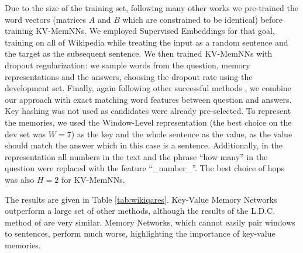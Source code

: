 Due to the size of the training set, following many
other works \citep{yang2015wikiqa,santos2016attentive,miao2015neural}
we pre-trained the word vectors (matrices $A$ and $B$ which are constrained to be identical)
before training KV-MemNNs.
We employed Supervised Embeddings \citep{dodge2015evaluating}
for that goal, training on all of Wikipedia while
treating the input as a random sentence and the target as the subsequent sentence.
We then trained KV-MemNNs with dropout regularization:
we sample words from the question, memory representations and the answers,
choosing the dropout rate using the development set.
Finally, again following other successful methods \citep{yin2015convolutional},
we combine our approach
with exact matching word features between question and answers.
Key hashing was not used as candidates were already pre-selected.
To represent the memories, we used the Window-Level representation (the best choice on
the dev set was $W=7$) as the key and the whole sentence as the value, as the value should match the answer which in this case is a sentence.
Additionally, in the representation
all numbers in the text and the phrase ``how many'' in the question
were replaced with the feature ``\_number\_''.
The best choice of hops was also $H=2$ for KV-MemNNs.

The results are given in Table \ref{tab:wikiqares}.
Key-Value Memory Networks outperform a large set of other methods,
although the results of the L.D.C. method of \citep{wang2016sentence} are very similar.
Memory Networks, which cannot easily pair windows to sentences, perform much worse,
highlighting the importance of key-value memories.
